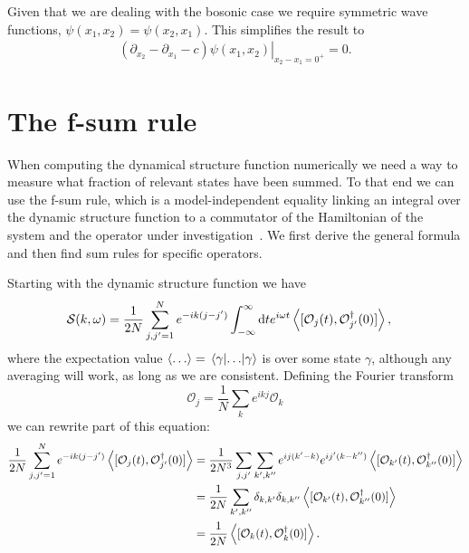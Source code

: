 \documentclass[11pt, a4paper]{report} %
\begin{document}
Given that we are dealing with the bosonic case we require symmetric wave functions, \(\psi(x_1,x_2)=\psi(x_2,x_1)\).
This simplifies the result to
\begin{align}
  \label{eq:20}
  \left.(\partial_{x_2} - \partial_{x_1} - c) \psi(x_1, x_2)\right|_{x_2-x_1=0^+} = 0.
\end{align}

\chapter{The f-sum rule}\label{cha:f-sum-rule}

When computing the dynamical structure function numerically we need a way to measure what fraction of relevant states have been summed.
To that end we can use the f-sum rule, which is a model-independent equality linking an integral over the dynamic structure function to a commutator of the Hamiltonian of the system and the operator under investigation~\cite{pitaevskii}.
We first derive the general formula and then find sum rules for specific operators.

Starting with the dynamic structure function we have
\begin{align}
  	\mathcal{S}(k,\omega) &= \frac{1}{2N} \sum_{j,j'=1}^{N} e^{-ik(j-j')} \int_{-\infty}^{\infty}\dd t e^{i\omega t}\expval{[\mathcal{O}_j(t),\mathcal{O}_{j'}^{\dagger}(0)]},
\end{align}
where the expectation value \(\expval{\ldots} = \matrixel{\gamma}{\ldots}{\gamma}\) is over some state \(\gamma\), although any averaging will work, as long as we are consistent.
Defining the Fourier transform
\begin{equation}
  \mathcal{O}_j = \frac{1}{N} \sum_k e^{ikj} \mathcal{O}_k
\end{equation}
we can rewrite part of this equation:
\begin{align}
  \frac{1}{2N} \sum_{j,j'=1}^{N} e^{-ik(j-j')} \expval{[\mathcal{O}_j(t),\mathcal{O}_{j'}^{\dagger}(0)]} &= \frac{1}{2N^3} \sum_{j, j'}\sum_{k',k''} e^{ij(k'-k)}e^{ij'(k-k'')}  \expval{[\mathcal{O}_{k'}(t),\mathcal{O}_{k''}^{\dagger}(0)]}\\
&= \frac{1}{2N} \sum_{k',k''} \delta_{k,k'}\delta_{k,k''}  \expval{[\mathcal{O}_{k'}(t),\mathcal{O}_{k''}^{\dagger}(0)]} \\
&= \frac{1}{2N}  \expval{[\mathcal{O}_{k}(t),\mathcal{O}_{k}^{\dagger}(0)]}.
\end{align}
\end{document}
